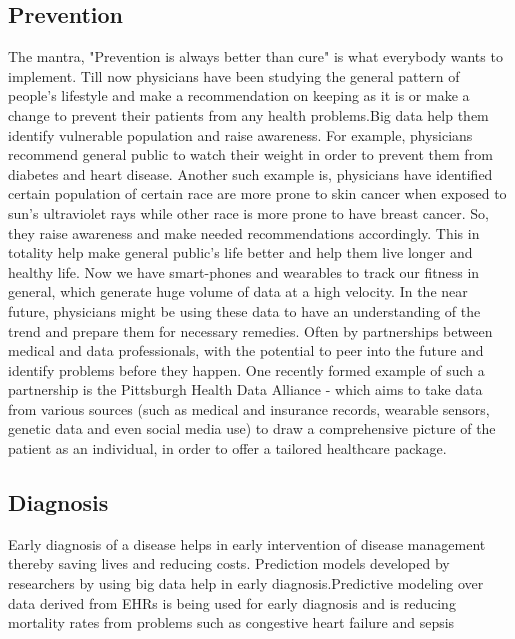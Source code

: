 \documentclass[sigconf]{acmart}
\begin{document}
\subsection{Prevention}

The mantra, "Prevention is always better than cure" is what everybody
wants to implement. Till now physicians have been studying the general pattern of people's lifestyle and make a recommendation on keeping as it is or make a change to prevent their patients from any health problems.Big data help them identify vulnerable population and raise awareness. For example, physicians recommend general public to watch their weight in order to prevent them from diabetes and heart disease. Another such example is, physicians have identified certain population of certain race are more prone to skin cancer when exposed to sun's ultraviolet rays while other race is more prone to have breast cancer. So, they raise awareness and make needed recommendations accordingly. This in totality help make general public's life better and help them live longer and healthy life. Now we have smart-phones and wearables to track our fitness in general, which generate huge volume of data at a high velocity. In the near future, physicians might be using these data to have an understanding of the trend and prepare them for necessary remedies. Often by partnerships between medical and data professionals, with the potential to peer into the future and identify problems before they happen\cite{www-forbes-com}. One recently formed example of such a partnership is the Pittsburgh Health Data Alliance - which aims to take data from various sources (such as medical and insurance records, wearable sensors, genetic data and even social media use) to draw a comprehensive picture of the patient as an individual, in order to offer a tailored healthcare package\cite{www-forbes-com}.   

 

\subsection{Diagnosis}
Early diagnosis of a disease helps in early intervention of disease management thereby saving lives and reducing costs. Prediction models developed by researchers by using big data help in early diagnosis.Predictive modeling over data derived from EHRs is being used for early diagnosis and is reducing mortality rates from problems such as congestive heart failure and sepsis\cite{www-mapr-com}
\end{document}
